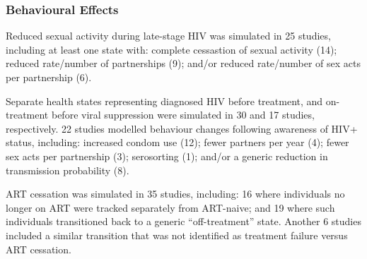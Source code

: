 \subsubsection{Behavioural Effects}\label{sr.res.factors.behav}
Reduced sexual activity during late-stage HIV was simulated in 25 studies,
including at least one state with:
complete cessastion of sexual activity (14);
reduced rate/number of partnerships (9); and/or
reduced rate/number of sex acts per partnership (6).
\par
Separate health states representing diagnosed HIV before treatment,
and on-treatment before viral suppression were simulated in
30 and 17 studies, respectively.
22 studies modelled behaviour changes following awareness of HIV+ status, including:
increased condom use (12);
fewer partners per year (4);
fewer sex acts per partnership (3);
serosorting (1); and/or
a generic reduction in transmission probability (8).
\par
ART cessation was simulated in 35 studies, including:
16 where individuals no longer on ART were tracked separately from ART-naive; and
19 where such individuals transitioned back to a generic ``off-treatment'' state.
Another 6 studies included a similar transition
that was not identified as treatment failure versus ART cessation.
